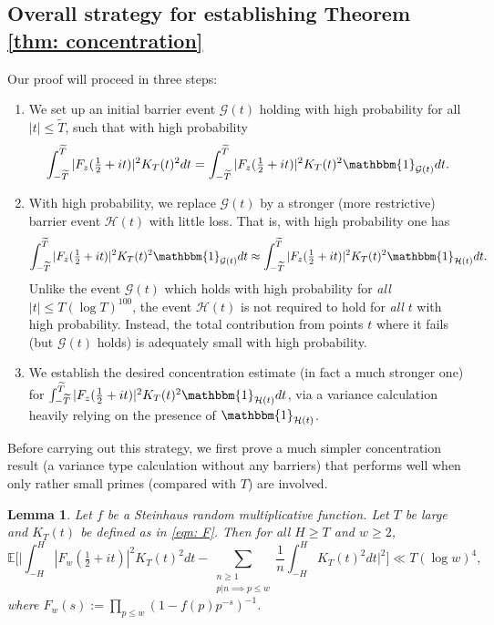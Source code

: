 \documentclass[12pt, notitlepage]{amsart}
\numberwithin{equation}{section}
\def\E{\mathbb E}
\def\TT{\widetilde{T}}
\newtheorem{lemma}[theorem]{Lemma}
\theoremstyle{remark}
\theoremstyle{definition}
\theoremstyle{remark}
\numberwithin{equation}{section}
\begin{document}
\subsection*{Overall strategy for establishing Theorem \ref{thm: concentration}}  Our proof will proceed in three steps: 
\begin{enumerate}
    \item We set up an initial barrier event $\mathcal{G}(t)$ holding with high probability for all $|t| \leq \TT$, such that with high probability  
$$
\int_{-\TT}^{\TT} |F_z(\tfrac{1}{2}+it)|^{2} K_T(t)^{2} dt = \int_{-\TT}^{\TT} |F_z(\tfrac{1}{2}+it)|^{2} K_T(t)^{2} \mathbbm{1}_{\mathcal{G}(t)} dt. 
$$ 
\item With high probability, we replace $\mathcal{G}(t)$ by a stronger (more restrictive) barrier event $\mathcal{H}(t)$ with little loss.  That is, with high probability one has 
$$
\int_{-\TT}^{\TT} |F_z(\tfrac{1}{2}+it)|^{2} K_T(t)^{2} \mathbbm{1}_{\mathcal{G}(t)} dt \approx \int_{-\TT}^{\TT} |F_z(\tfrac{1}{2}+it)|^{2} K_T(t)^{2} \mathbbm{1}_{\mathcal{H}(t)} dt.
$$
Unlike the event $\mathcal{G}(t)$ which holds with high probability for {\em all} $|t|\le T(\log T)^{100}$, the event $\mathcal{H}(t)$ is not required to hold for {\em all} $t$ with high probability.  Instead, the total contribution from points $t$ where it fails (but $\mathcal{G}(t)$ holds) is adequately small with high probability.
\item We establish the desired concentration estimate (in fact a much stronger one) for $\int_{-\TT}^{\TT } |F_z(\frac{1}{2}+it) |^{2} K_T(t)^{2} \mathbbm{1}_{\mathcal{H}(t)} dt$, via a variance calculation heavily relying on the presence of $\mathbbm{1}_{\mathcal{H}(t)}$. 
\end{enumerate}

\vspace{12pt}
Before carrying out this strategy, we first prove a much simpler concentration result (a variance type calculation without any barriers) that performs well when only rather small primes (compared with $T$) are involved. 
\begin{lemma}\label{lem: concentration}
    Let $f$ be a Steinhaus random multiplicative function. Let $T$ be large and $K_T(t)$ be defined as in \eqref{eqn: F}. Then for all $H\ge T$ and $w \ge 2$,  
    \[
    \E\Big[\Big|\int_{-H}^{H} |F_w(\tfrac{1}{2}+it)|^{2} K_T(t)^{2}dt - \sum_{\substack{n\ge 1\\  p|n \implies p\le w}} \frac{1}{n} \int_{-H}^{H} K_T(t)^{2}  dt  \Big|^{2}\Big]\ll T (\log w)^{4} , 
    \]
where $F_w(s):= \prod_{p \leq w} (1 - {f(p)}{p^{-s}} )^{-1}$.
\end{lemma}
\end{document}
